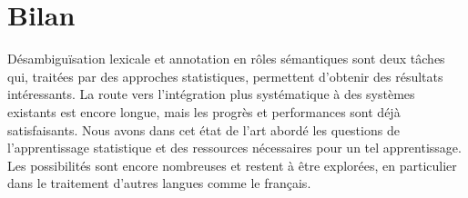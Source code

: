 \section{Bilan}

Désambiguïsation lexicale et annotation en rôles sémantiques sont deux tâches
qui, traitées par des approches statistiques, permettent d'obtenir des
résultats intéressants. La route vers l'intégration plus systématique à des
systèmes existants est encore longue, mais les progrès et performances sont
déjà satisfaisants. Nous avons dans cet état de l'art abordé les questions de
l'apprentissage statistique et des ressources nécessaires pour un tel
apprentissage. Les possibilités sont encore nombreuses et restent à être
explorées, en particulier dans le traitement d'autres langues comme le
français.


